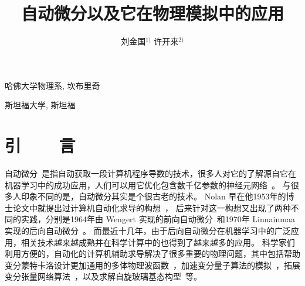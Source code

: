 \documentclass[A4,twoside,UTF8]{ctexart}
\begin{document}
\apsname

\title{自动微分以及它在物理模拟中的应用\fivestar}%

\author{刘金国$^{1)}$ \quad 许开来$^{2)}$}

\address{1)}{哈佛大学物理系, 坎布里奇 }
\address{2)}{斯坦福大学, 斯坦福 }





\cfund{}




{}\baselineskip


\section{引~~~~言}


    自动微分~\cite{Griewank2008}是指自动获取一段计算机程序导数的技术，很多人对它的了解源自它在机器学习中的成功应用，人们可以用它优化包含数千亿参数的神经元网络~\cite{Rosset2019}。
与很多人印象不同的是，自动微分其实是个很古老的技术。
Nolan 早在他1953年的博士论文中就提出过计算机自动化求导的构想~\cite{Nolan1953}，
后来针对这一构想又出现了两种不同的实践，分别是1964年由 Wengert 实现的前向自动微分~\cite{Wengert1964}和1970年 Linnainmaa 实现的后向自动微分~\cite{Linnainmaa1976}。
而最近十几年，由于后向自动微分在机器学习中的广泛应用，相关技术越来越成熟并在科学计算中的也得到了越来越多的应用。
科学家们利用方便的，自动化的计算机辅助求导解决了很多重要的物理问题，其中包括帮助变分蒙特卡洛设计更加通用的多体物理波函数~\cite{Gutzwiller1963,Carleo2017, Deng2017,Cai2018}，加速变分量子算法的模拟~\cite{Luo2020}，拓展变分张量网络算法~\cite{Liao2019}，以及求解自旋玻璃基态构型~\cite{Liu2021}等。
\end{document}
